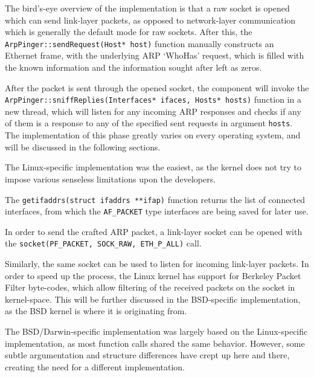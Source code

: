 \documentclass[a4paper,12pt]{article}
\begin{document}
	The bird's-eye overview of the implementation is that a raw socket is opened which can send link-layer packets, as opposed to network-layer communication which is generally the default mode for raw sockets. After this, the \texttt{ArpPinger::sendRequest(Host* host)} function manually constructs an Ethernet frame, with the underlying ARP `WhoHas' request, which is filled with the known information and the information sought after left as zeros.

	After the packet is sent through the opened socket, the component will invoke the \texttt{ArpPinger::sniffReplies(Interfaces* ifaces, Hosts* hosts)} function in a new thread, which will listen for any incoming ARP responses and checks if any of them is a response to any of the specified sent requests in argument \texttt{hosts}. The implementation of this phase greatly varies on every operating system, and will be discussed in the following sections.

 

	The Linux-specific implementation was the easiest, as the kernel does not try to impose various senseless limitations upon the developers.
	
	The \texttt{getifaddrs(struct ifaddrs **ifap)} function returns the list of connected interfaces, from which the \texttt{AF_PACKET} type interfaces are being saved for later use.

	In order to send the crafted ARP packet, a link-layer socket can be opened with the \texttt{socket(PF_PACKET, SOCK_RAW, ETH_P_ALL)} call.
	
	Similarly, the same socket can be used to listen for incoming link-layer packets. In order to speed up the process, the Linux kernel has support for Berkeley Packet Filter byte-codes, which allow filtering of the received packets on the socket in kernel-space. This will be further discussed in the BSD-specific implementation, as the BSD kernel is where it is originating from.

 

	The BSD/Darwin-specific implementation was largely based on the Linux-specific implementation, as most function calls shared the same behavior. However, some subtle argumentation and structure differences have crept up here and there, creating the need for a different implementation.
\end{document}
